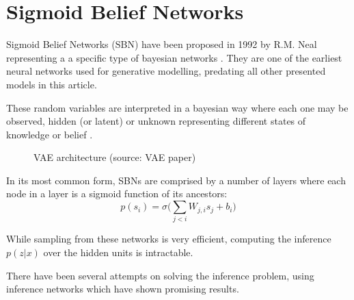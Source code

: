 \section{Sigmoid Belief Networks}
\label{sec:sbn}
Sigmoid Belief Networks (SBN) have been proposed in 1992 by R.M. Neal \cite{neal:1992} representing a a specific type of bayesian networks \cite{pearl:1985}.
They are one of the earliest neural networks used for generative modelling, predating all other presented models in this article.

These random variables are interpreted in a bayesian way where each one may be observed, hidden (or latent) or unknown representing different states of knowledge or belief \cite{definetti:1974}.

\begin{figure}[htb]
\centering

  \caption{VAE architecture (source: VAE paper)}\label{fig:vae_architecture}
\end{figure}
In its most common form, SBNs are comprised by a number of layers where each node in a layer is a sigmoid function of its ancestors:
$$
p(s_i) = \sigma\bigg(\sum_{j<i}W_{j,i}s_j+b_i\bigg)
$$

While sampling from these networks is very efficient, computing the inference $p(z|x)$ over the hidden units is intractable.

There have been several attempts on solving the inference problem, using inference networks which have shown promising results.


